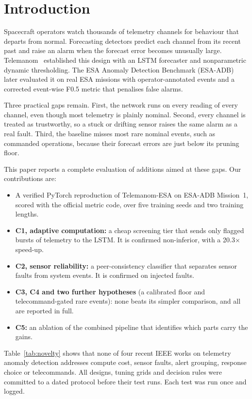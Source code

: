 \documentclass[conference]{IEEEtran}
\begin{document}
\section{Introduction}
Spacecraft operators watch thousands of telemetry channels for behaviour that departs from normal. Forecasting detectors predict each channel from its recent past and raise an alarm when the forecast error becomes unusually large. Telemanom~\cite{hundman2018telemanom} established this design with an LSTM forecaster and nonparametric dynamic thresholding. The ESA Anomaly Detection Benchmark (ESA-ADB)~\cite{kotowski2024esaadb} later evaluated it on real ESA missions with operator-annotated events and a corrected event-wise F0.5 metric that penalises false alarms.

Three practical gaps remain. First, the network runs on every reading of every channel, even though most telemetry is plainly nominal. Second, every channel is treated as trustworthy, so a stuck or drifting sensor raises the same alarm as a real fault. Third, the baseline misses most rare nominal events, such as commanded operations, because their forecast errors are just below its pruning floor.

This paper reports a complete evaluation of additions aimed at these gaps. Our contributions are:
\begin{itemize}
\item A verified PyTorch reproduction of Telemanom-ESA on ESA-ADB Mission~1, scored with the official metric code, over five training seeds and two training lengths.
\item \textbf{C1, adaptive computation:} a cheap screening tier that sends only flagged bursts of telemetry to the LSTM. It is confirmed non-inferior, with a 20.3$\times$ speed-up.
\item \textbf{C2, sensor reliability:} a peer-consistency classifier that separates sensor faults from system events. It is confirmed on injected faults.
\item \textbf{C3, C4 and two further hypotheses} (a calibrated floor and telecommand-gated rare events): none beats its simpler comparison, and all are reported in full.
\item \textbf{C5:} an ablation of the combined pipeline that identifies which parts carry the gains.
\end{itemize}
Table~\ref{tab:novelty} shows that none of four recent IEEE works on telemetry anomaly detection addresses compute cost, sensor faults, alert grouping, response choice or telecommands. All designs, tuning grids and decision rules were committed to a dated protocol before their test runs. Each test was run once and logged.
\end{document}
